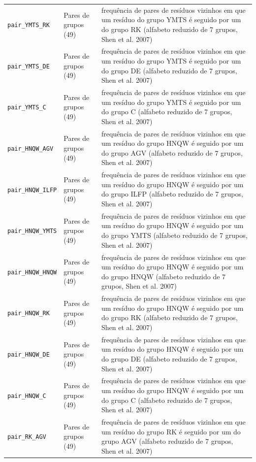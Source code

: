 \begin{longtable}{p{4.2cm}p{2.6cm}p{8cm}}
  \texttt{pair\_YMTS\_RK} & Pares de grupos (49) & frequência de pares de resíduos vizinhos em que um resíduo do grupo {YMTS} é seguido por um do grupo {RK} (alfabeto reduzido de 7 grupos, Shen et al. 2007) \\
  \texttt{pair\_YMTS\_DE} & Pares de grupos (49) & frequência de pares de resíduos vizinhos em que um resíduo do grupo {YMTS} é seguido por um do grupo {DE} (alfabeto reduzido de 7 grupos, Shen et al. 2007) \\
  \texttt{pair\_YMTS\_C} & Pares de grupos (49) & frequência de pares de resíduos vizinhos em que um resíduo do grupo {YMTS} é seguido por um do grupo {C} (alfabeto reduzido de 7 grupos, Shen et al. 2007) \\
  \texttt{pair\_HNQW\_AGV} & Pares de grupos (49) & frequência de pares de resíduos vizinhos em que um resíduo do grupo {HNQW} é seguido por um do grupo {AGV} (alfabeto reduzido de 7 grupos, Shen et al. 2007) \\
  \texttt{pair\_HNQW\_ILFP} & Pares de grupos (49) & frequência de pares de resíduos vizinhos em que um resíduo do grupo {HNQW} é seguido por um do grupo {ILFP} (alfabeto reduzido de 7 grupos, Shen et al. 2007) \\
  \texttt{pair\_HNQW\_YMTS} & Pares de grupos (49) & frequência de pares de resíduos vizinhos em que um resíduo do grupo {HNQW} é seguido por um do grupo {YMTS} (alfabeto reduzido de 7 grupos, Shen et al. 2007) \\
  \texttt{pair\_HNQW\_HNQW} & Pares de grupos (49) & frequência de pares de resíduos vizinhos em que um resíduo do grupo {HNQW} é seguido por um do grupo {HNQW} (alfabeto reduzido de 7 grupos, Shen et al. 2007) \\
  \texttt{pair\_HNQW\_RK} & Pares de grupos (49) & frequência de pares de resíduos vizinhos em que um resíduo do grupo {HNQW} é seguido por um do grupo {RK} (alfabeto reduzido de 7 grupos, Shen et al. 2007) \\
  \texttt{pair\_HNQW\_DE} & Pares de grupos (49) & frequência de pares de resíduos vizinhos em que um resíduo do grupo {HNQW} é seguido por um do grupo {DE} (alfabeto reduzido de 7 grupos, Shen et al. 2007) \\
  \texttt{pair\_HNQW\_C} & Pares de grupos (49) & frequência de pares de resíduos vizinhos em que um resíduo do grupo {HNQW} é seguido por um do grupo {C} (alfabeto reduzido de 7 grupos, Shen et al. 2007) \\
  \texttt{pair\_RK\_AGV} & Pares de grupos (49) & frequência de pares de resíduos vizinhos em que um resíduo do grupo {RK} é seguido por um do grupo {AGV} (alfabeto reduzido de 7 grupos, Shen et al. 2007) \\

\end{longtable}
